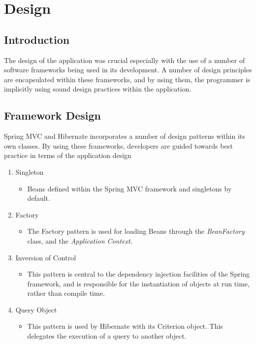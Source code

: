 \chapter{Design}
\label{design}

\section{Introduction}

The design of the application was crucial especially with the use of a number of software frameworks being used in its development. A number of design principles are encapsulated within these frameworks, and by using them, the programmer is implicitly using sound design practices within the application. 

\section{Framework Design}

Spring MVC and Hibernate incorporates a number of design patterns within its own classes. By using these frameworks, developers are guided towards best practice in terms of the application design


\begin{enumerate}
\item Singleton
\begin{itemize}
\item Beans defined within the Spring MVC framework and singletons by default. 
\end{itemize}
\item Factory
\begin{itemize}
\item The Factory pattern is used for loading Beans through the \textit{BeanFactory} class, and the \textit{Application Context}. 
\end{itemize}
\item Inversion of Control
\begin{itemize}
\item This pattern is central to the dependency injection facilities of the Spring framework, and is responsible for the instantiation of objects at run time, rather than compile time.
\end{itemize}
\newpage
\item Query Object
\begin{itemize}
\item This pattern is used by Hibernate with its Criterion object. This delegates the execution of a query to another object. 
\end{itemize}
\end{enumerate}

